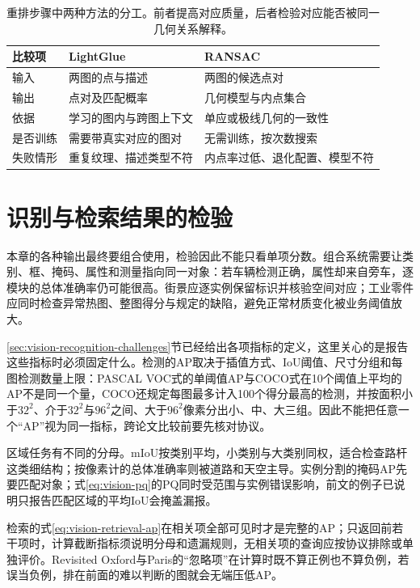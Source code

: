 \begin{table}[htbp]
 \centering
 \small
 \begin{tabularx}{\linewidth}{@{}lXX@{}}
 \toprule
 比较项 & LightGlue & RANSAC\\
 \midrule
 输入 & 两图的点与描述 & 两图的候选点对\\
 输出 & 点对及匹配概率 & 几何模型与内点集合\\
 依据 & 学习的图内与跨图上下文 & 单应或极线几何的一致性\\
 是否训练 & 需要带真实对应的图对 & 无需训练，按次数搜索\\
 失败情形 & 重复纹理、描述类型不符 & 内点率过低、退化配置、模型不符\\
 \bottomrule
 \end{tabularx}
 \caption{重排步骤中两种方法的分工。前者提高对应质量，后者检验对应能否被同一几何关系解释。}
 \label{tab:vision-recognition-rerank-compare}
\end{table}

\section{识别与检索结果的检验}
\label{sec:vision-recognition-evaluation}

本章的各种输出最终要组合使用，检验因此不能只看单项分数。组合系统需要让类别、框、掩码、属性和测量指向同一对象：若车辆检测正确，属性却来自旁车，逐模块的总体准确率仍可能很高。街景应逐实例保留标识并核验空间对应；工业零件应同时检查异常热图、整图得分与规定的缺陷，避免正常材质变化被业务阈值放大。

\ref{sec:vision-recognition-challenges}节已经给出各项指标的定义，这里关心的是报告这些指标时必须固定什么。检测的AP取决于插值方式、IoU阈值、尺寸分组和每图检测数量上限：PASCAL VOC式的单阈值AP与COCO式在10个阈值上平均的AP不是同一个量，COCO还规定每图最多计入100个得分最高的检测，并按面积小于$32^2$、介于$32^2$与$96^2$之间、大于$96^2$像素分出小、中、大三组。因此不能把任意一个“AP”视为同一指标，跨论文比较前要先核对协议。

区域任务有不同的分母。mIoU按类别平均，小类别与大类别同权，适合检查路杆这类细结构；按像素计的总体准确率则被道路和天空主导。实例分割的掩码AP先要匹配对象；式\eqref{eq:vision-pq}的PQ同时受范围与实例错误影响，前文的例子已说明只报告匹配区域的平均IoU会掩盖漏报。

检索的式\eqref{eq:vision-retrieval-ap}在相关项全部可见时才是完整的AP；只返回前若干项时，计算截断指标须说明分母和遗漏规则，无相关项的查询应按协议排除或单独评价。Revisited Oxford与Paris的“忽略项”在计算时既不算正例也不算负例，若误当负例，排在前面的难以判断的图就会无端压低AP。

